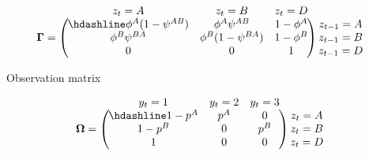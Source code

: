 \documentclass[
  12pt,
]{krantz}
\begin{document}
\[\begin{matrix}
& \\
\mathbf{\Gamma} =
\left ( \vphantom{ \begin{matrix} 12 \\ 12 \\ 12 \end{matrix} } \right .
\end{matrix}
\hspace{-1.2em}
\begin{matrix}
z_t=A & z_t=B & z_t=D \\ \hdashline
\phi^A (1-\psi^{AB}) & \phi^A \psi^{AB} & 1 - \phi^A\\
\phi^B \psi^{BA} & \phi^B (1-\psi^{BA}) & 1 - \phi^B\\
0 & 0 & 1
\end{matrix}
\hspace{-0.2em}
\begin{matrix}
& \\
\left . \vphantom{ \begin{matrix} 12 \\ 12 \\ 12 \end{matrix} } \right )
\begin{matrix}
z_{t-1}=A \\ z_{t-1}=B \\ z_{t-1}=D
\end{matrix}
\end{matrix}\]

Observation matrix

\[\begin{matrix}
& \\
\mathbf{\Omega} =
\left ( \vphantom{ \begin{matrix} 12 \\ 12 \\ 12 \end{matrix} } \right .
\end{matrix}
\hspace{-1.2em}
\begin{matrix}
y_t=1 & y_t=2 & y_t=3 \\ \hdashline
1 - p^A & p^A & 0\\
1 - p^B & 0 & p^B\\
1 & 0 & 0
\end{matrix}
\hspace{-0.2em}
\begin{matrix}
& \\
\left . \vphantom{ \begin{matrix} 12 \\ 12 \\ 12 \end{matrix} } \right )
\begin{matrix}
z_{t}=A \\ z_{t}=B \\ z_{t}=D
\end{matrix}
\end{matrix}\]
\end{document}
